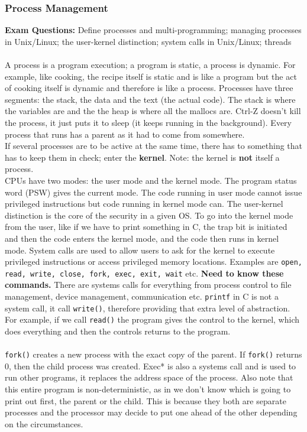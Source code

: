 \documentclass[twoside]{article}
\begin{document}
\subsubsection{Process Management}
\textbf{Exam Questions:} Define processes and multi-programming; managing processes in Unix/Linux; the user-kernel distinction; system calls in Unix/Linux; threads\\ \\
A process is a program execution; a program is static, a process is dynamic. For example, like cooking, the recipe itself is static and is like a program but the act of cooking itself is dynamic and therefore is like a process. Processes have three segments: the stack, the data and the text (the actual code). The stack is where the variables are and the the heap is where all the mallocs are.  Ctrl-Z doesn't kill the process, it just puts it to sleep (it keeps running in the background). Every process that runs has a parent as it had to come from somewhere.\\
If several processes are to be active at the same time, there has to something that has to keep them in check; enter the \textbf{kernel}. Note: the kernel is \textbf{not} itself a process.\\
CPUs have two modes: the user mode and the kernel mode. The program status word (PSW) gives the current mode. The code running in user mode cannot issue privileged instructions but code running in kernel mode can. The user-kernel distinction is the core of the security in a given OS. To go into the kernel mode from the user, like if we have to print something in C, the trap bit is initiated and then the code enters the kernel mode, and the code then runs in kernel mode. System calls are used to allow users to ask for the kernel to execute privileged instructions or access privileged memory locations. Examples are \texttt{open, read, write, close, fork, exec, exit, wait} etc. \textbf{Need to know these commands.} There are systems calls for everything from process control to file management, device management, communication etc. \texttt{printf} in C is not a system call, it call \texttt{write()}, therefore providing that extra level of abstraction. For example, if we call \texttt{read()} the program gives the control to the kernel, which does everything and then the controls returns to the program. \\ \\
\texttt{fork()} creates a new process with the exact copy of the parent. If \texttt{fork()} returns 0, then the child process was created. Exec* is also a systems call and is used to run other programs, it replaces the address space of the process. Also note that this entire program is non-deterministic, as in we don't know which is going to print out first, the parent or the child. This is because they both are separate processes and the processor may decide to put one ahead of the other depending on the circumstances.
\end{document}
